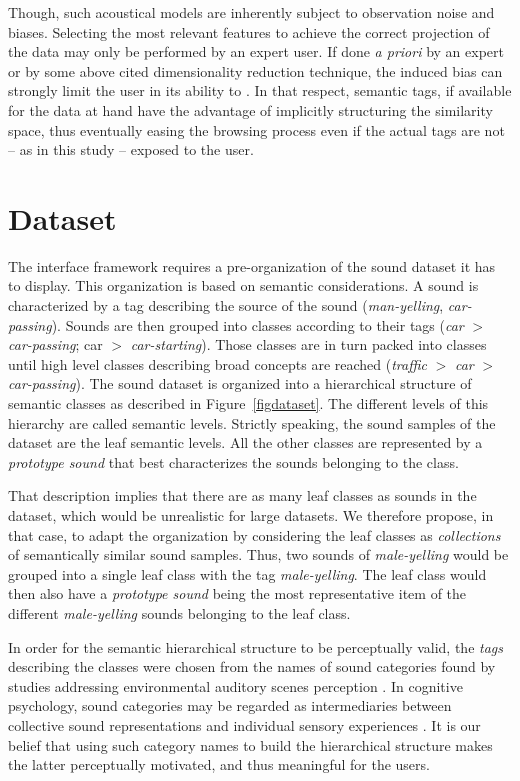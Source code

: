 \documentclass{aes2e}
\begin{document}
Though, such acoustical models are inherently subject to observation noise and biases. Selecting the most relevant features to achieve the correct projection of the data may only be performed by an expert user. If done \textit{a priori} by an expert or by some above cited dimensionality reduction technique, the induced bias can strongly limit the user in its ability to . In that respect, semantic tags, if available for the data at hand have the advantage of implicitly structuring the similarity space, thus eventually easing the browsing process even if the actual tags are not -- as in this study -- exposed to the user.

\section{Dataset} \label{dataset}

The interface framework requires a pre-organization of the sound dataset it has to display. This organization is based on semantic considerations. A sound is characterized by a tag describing the source of the sound (\textit{man-yelling}, \textit{car-passing}). Sounds are then grouped into classes according to their tags (\textit{car} $>$ \textit{car-passing}; car $>$ \textit{car-starting}). Those classes are in turn  packed into classes until high level classes describing broad concepts are reached (\textit{traffic} $>$ \textit{car} $>$ \textit{car-passing}). The sound dataset is organized into a hierarchical structure of semantic classes as described in Figure~\ref{figdataset}. The different levels of this hierarchy are called semantic levels. Strictly speaking, the sound samples of the dataset are the leaf semantic levels. All the other classes are represented by a \textit{prototype sound} that best characterizes the sounds belonging to the class. 

That description implies that there are as many leaf classes as sounds in the dataset, which would be unrealistic for large datasets. We therefore propose, in that case, to adapt the organization by considering the leaf classes as \textit{collections} of semantically similar sound samples. Thus, two sounds of \textit{male-yelling} would be grouped into a  single leaf class with the tag \textit{male-yelling}. The leaf class would then also have a \textit{prototype sound} being the most representative item of the different \textit{male-yelling} sounds belonging to the leaf class.

In order for the semantic hierarchical structure to be perceptually valid, the \textit{tags} describing the classes  were chosen from the names of sound categories found by studies addressing environmental auditory scenes perception \cite{niessen2010categories, brown2011towards, dubois2006cognitive}. In cognitive psychology, sound categories may be regarded as intermediaries between collective sound representations and individual sensory experiences \cite{dubois2006cognitive}. It is our belief that using such category names to build the hierarchical structure makes the latter perceptually motivated, and thus meaningful for the users.
\end{document}
